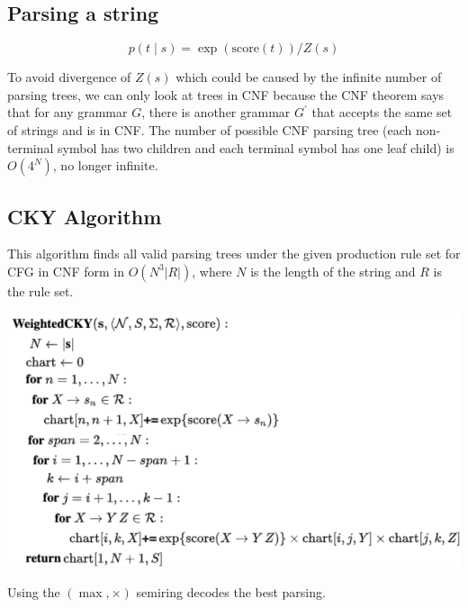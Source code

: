 \subsection*{Parsing a string}

\vspace{-0.4cm}
$$p(t\mid s) = {\exp(\text{score}(t))}/{Z(s)}$$
\vspace{-0.5cm}

To avoid divergence of $Z(s)$ which could be caused by the infinite number of parsing trees, we can only look at trees in CNF because the CNF theorem says that for any grammar $G$, there is another grammar $G^\prime$ that accepts the same set of strings and is in CNF. The number of possible CNF parsing tree (each non-terminal symbol has two children and each terminal symbol has one leaf child) is $O(4^N)$, no longer infinite.

\subsection*{CKY Algorithm}

This algorithm finds all valid parsing trees under the given production rule set for CFG in CNF form in $O(N^3 |R|)$, where $N$ is the length of the string and $R$ is the rule set.

\vspace{-0.4cm}
\begin{center}
    \includegraphics[width=\columnwidth]{img/CKY.png}
\end{center}
\vspace{-0.4cm}

Using the $(\max, \times)$ semiring decodes the best parsing.
